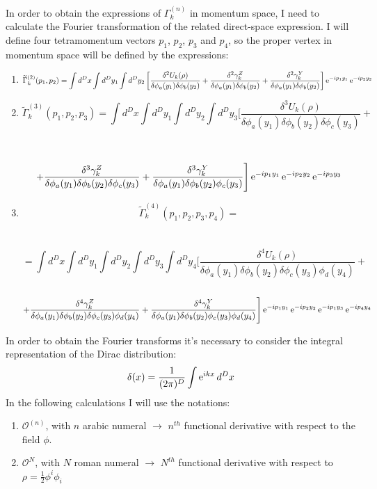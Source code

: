 In order to obtain the expressions of $\Gamma_k^{(n)}$  in momentum space, I need to calculate the Fourier transformation of the related direct-space expression.
I will define four tetramomentum vectors $p_1$, $p_2$, $p_3$ and $p_4$, so the proper vertex in momentum space will be defined by the expressions:
\begin{enumerate}
 \item $$\widetilde{\Gamma}^{(2)}_k(p_1, p_2) = \int  d^Dx \int d^Dy_1\int d^Dy_2 \left[\frac{\delta^2 U_k(\rho)}{\delta \phi_a(y_1)\delta \phi_b(y_2)} + \frac{\delta^2 \gamma_k^{Z}}{\delta \phi_a(y_1)\delta \phi_b(y_2)} +\frac{\delta^2 \gamma_k^{Y}}{\delta \phi_a(y_1)\delta \phi_b(y_2)} \right]\operatorname{e}^{-ip_1y_1}\operatorname{e}^{-ip_2y_2}$$
 \item $$\widetilde{\Gamma}^{(3)}_k(p_1, p_2, p_3) =  \int  d^Dx \int d^Dy_1\int d^Dy_2 \int d^Dy_3 \Bigg[\frac{\delta^3 U_k(\rho)}{\delta \phi_a(y_1)\delta \phi_b(y_2)\delta \phi_c(y_3)} + $$  \\ \\ 
       $$ + \frac{\delta^3 \gamma_k^{Z}}{\delta \phi_a(y_1)\delta \phi_b(y_2)\delta \phi_c(y_3)} +\frac{\delta^3 \gamma_k^{Y}}{\delta \phi_a(y_1)\delta \phi_b(y_2)\phi_c(y_3)} \Bigg]\operatorname{e}^{-ip_1y_1}\operatorname{e}^{-ip_2y_2}\operatorname{e}^{-ip_3y_3}$$
 \item $$\widetilde{\Gamma}^{(4)}_k(p_1, p_2, p_3, p_4) = $$ \\ \\ $$ = \int  d^Dx \int d^Dy_1 \int d^Dy_2 \int d^Dy_3\int d^Dy_4 \Big[\frac{\delta^4 U_k(\rho)}{\delta \phi_a(y_1)\delta \phi_b(y_2)\delta \phi_c(y_3)\phi_d(y_4)} + $$\\ $$ +\frac{\delta^4 \gamma_k^{Z}}{\delta \phi_a(y_1)\delta \phi_b(y_2)\delta \phi_c(y_3)\phi_d(y_4)}+\frac{\delta^4 \gamma_k^{Y}}{\delta \phi_a(y_1)\delta \phi_b(y_2)\phi_c(y_3)\phi_d(y_4)} \Bigg]\operatorname{e}^{-ip_1y_1}\operatorname{e}^{-ip_2y_2}\operatorname{e}^{-ip_1y_3}\operatorname{e}^{-ip_4y_4}$$
\end{enumerate}
In order to obtain the Fourier transforms it's necessary to consider the integral representation of the Dirac distribution:
\begin{equation*}
 \delta(x) = \frac{1}{(2\pi)^D}\int \operatorname{e}^{ikx}d^Dx
\end{equation*}
In the following calculations I will use the notations:
\begin{enumerate}
 \item $\mathcal{O}^{(n)}$, with $n$ arabic numeral $ \longrightarrow$  $n^{th}$ functional derivative with respect to the field $\phi$.
 \item $\mathcal{O}^{N}$, with $N$ roman numeral $ \longrightarrow$  $N^{th}$ functional derivative with respect to $\rho = \frac{1}{2}\phi^i\phi_i$
\end{enumerate}

